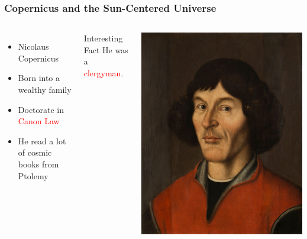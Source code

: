 \documentclass[aspectratio=1611, 9pt]{beamer}
\begin{document}
\begin{frame}
  \frametitle{Copernicus and the Sun-Centered Universe}
  \begin{columns}
    \begin{itemize}
      \item Nicolaus Copernicus
      \item Born into a wealthy family
      \item Doctorate in \textcolor{red}{Canon Law}
      \item He read a lot of cosmic books from Ptolemy
    \end{itemize}
    \begin{block}{Interesting Fact}
      He was a \textcolor{red}{clergyman}.
    \end{block}

    \begin{center}
      \includegraphics[width=1.0\textwidth]{pictures/copernicus.jpg}
    \end{center}
  \end{columns}
\end{frame}
\end{document}

